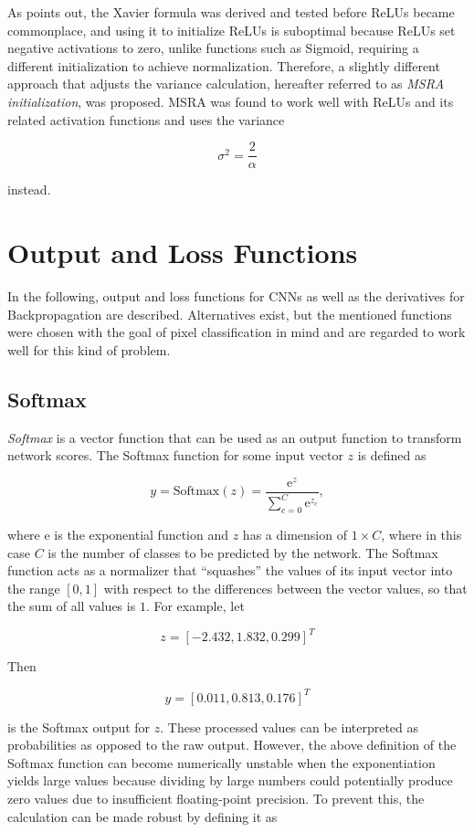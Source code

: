 \noindent As \cite{rectifiers} points out, the Xavier formula was derived and tested before ReLUs became commonplace, and using it to initialize ReLUs is suboptimal because ReLUs set negative activations to zero, unlike functions such as Sigmoid, requiring a different initialization to achieve normalization. Therefore, a slightly different approach that adjusts the variance calculation, hereafter referred to as \textit{MSRA initialization}, was proposed. MSRA was found to work well with ReLUs and its related activation functions and uses the variance

\[ \sigma^2 = \frac{2}{\alpha} \]

\noindent instead.


	\section {Output and Loss Functions}
In the following, output and loss functions for CNNs as well as the derivatives for Backpropagation are described. Alternatives exist, but the mentioned functions were chosen with the goal of pixel classification in mind and are regarded to work well for this kind of problem.


	\subsection{Softmax}
\label{subsec:softmax}

\textit{Softmax} is a vector function that can be used as an output function to transform network scores. The Softmax function for some input vector $z$ is defined as

\[y = \text{Softmax}(z) = \frac{\text{e}^{z}}{\sum_{c=0}^{C} \text{e}^{z_c}},\]

\noindent where e is the exponential function and $z$ has a dimension of $1 \times C$, where in this case $C$ is the number of classes to be predicted by the network. The Softmax function acts as a normalizer that ``squashes'' the values of its input vector into the range $[0, 1]$ with respect to the differences between the vector values, so that the sum of all values is $1$. For example, let 

\[ z = [-2.432, 1.832, 0.299]^T \]

\noindent Then 

\[ y = [0.011, 0.813, 0.176]^T \]

\noindent is the Softmax output for $z$. These processed values can be interpreted as probabilities as opposed to the raw output. However, the above definition of the Softmax function can become numerically unstable when the exponentiation yields large values because dividing by large numbers could potentially produce zero values due to insufficient floating-point precision. To prevent this, the calculation can be made robust by defining it as

